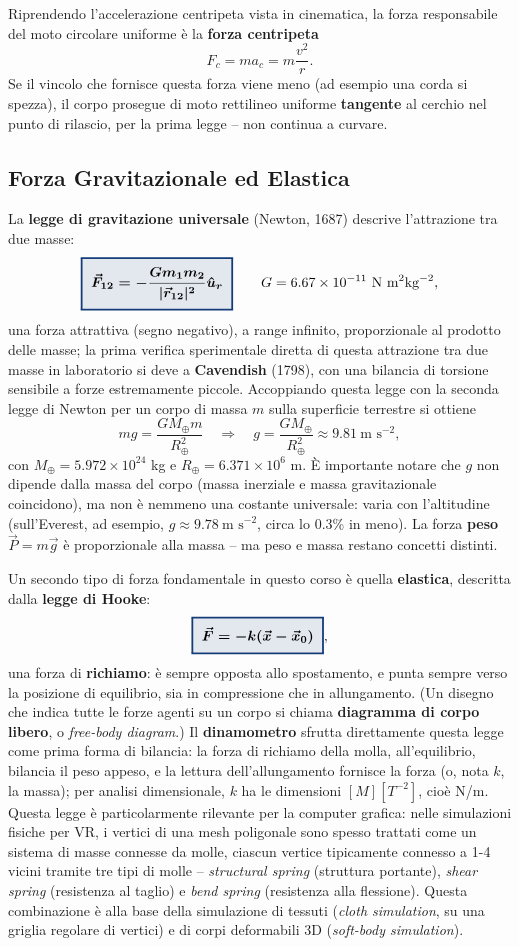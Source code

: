 \documentclass[a4paper,11pt]{article}
\newcommand{\keyeq}[1]{{\setlength{\fboxsep}{6pt}\setlength{\fboxrule}{1.3pt}\fcolorbox{chapblue}{chapblue!12}{\boldmath$\displaystyle #1$}}}
\begin{document}
Riprendendo l'accelerazione centripeta vista in cinematica, la forza responsabile del moto circolare uniforme è la \textbf{forza centripeta}
\[
F_c = ma_c = m\frac{v^2}{r}.
\]
Se il vincolo che fornisce questa forza viene meno (ad esempio una corda si spezza), il corpo prosegue di moto rettilineo uniforme \textbf{tangente} al cerchio nel punto di rilascio, per la prima legge -- non continua a curvare.

\subsection{Forza Gravitazionale ed Elastica}

La \textbf{legge di gravitazione universale} (Newton, 1687) descrive l'attrazione tra due masse:
\[
\keyeq{\vec F_{12} = -\frac{Gm_1m_2}{|\vec r_{12}|^2}\hat u_r} \qquad G = 6.67\times10^{-11}\ \text{N m}^2\text{kg}^{-2},
\]
una forza attrattiva (segno negativo), a range infinito, proporzionale al prodotto delle masse; la prima verifica sperimentale diretta di questa attrazione tra due masse in laboratorio si deve a \textbf{Cavendish} (1798), con una bilancia di torsione sensibile a forze estremamente piccole. Accoppiando questa legge con la seconda legge di Newton per un corpo di massa $m$ sulla superficie terrestre si ottiene
\[
mg = \frac{GM_\oplus m}{R_\oplus^2} \quad\Rightarrow\quad g = \frac{GM_\oplus}{R_\oplus^2} \approx 9.81\ \text{m s}^{-2},
\]
con $M_\oplus=5.972\times10^{24}$ kg e $R_\oplus=6.371\times10^6$ m. È importante notare che $g$ non dipende dalla massa del corpo (massa inerziale e massa gravitazionale coincidono), ma non è nemmeno una costante universale: varia con l'altitudine (sull'Everest, ad esempio, $g\approx9.78\ \text{m s}^{-2}$, circa lo 0.3\% in meno). La forza \textbf{peso} $\vec P=m\vec g$ è proporzionale alla massa -- ma peso e massa restano concetti distinti.

Un secondo tipo di forza fondamentale in questo corso è quella \textbf{elastica}, descritta dalla \textbf{legge di Hooke}:
\[
\keyeq{\vec F = -k(\vec x - \vec x_0)},
\]
una forza di \textbf{richiamo}: è sempre opposta allo spostamento, e punta sempre verso la posizione di equilibrio, sia in compressione che in allungamento. (Un disegno che indica tutte le forze agenti su un corpo si chiama \textbf{diagramma di corpo libero}, o \emph{free-body diagram}.) Il \textbf{dinamometro} sfrutta direttamente questa legge come prima forma di bilancia: la forza di richiamo della molla, all'equilibrio, bilancia il peso appeso, e la lettura dell'allungamento fornisce la forza (o, nota $k$, la massa); per analisi dimensionale, $k$ ha le dimensioni $[M][T^{-2}]$, cioè N/m. Questa legge è particolarmente rilevante per la computer grafica: nelle simulazioni fisiche per VR, i vertici di una mesh poligonale sono spesso trattati come un sistema di masse connesse da molle, ciascun vertice tipicamente connesso a 1-4 vicini tramite tre tipi di molle -- \emph{structural spring} (struttura portante), \emph{shear spring} (resistenza al taglio) e \emph{bend spring} (resistenza alla flessione). Questa combinazione è alla base della simulazione di tessuti (\emph{cloth simulation}, su una griglia regolare di vertici) e di corpi deformabili 3D (\emph{soft-body simulation}).
\end{document}
